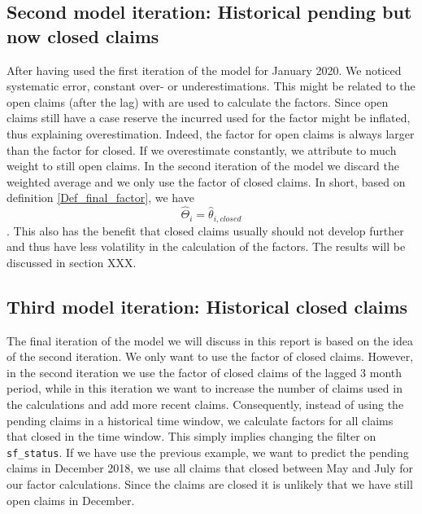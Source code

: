 \subsection{Second model iteration: Historical pending but now closed claims}
After having used the first iteration of the model for January 2020. We noticed systematic error, constant over- or underestimations. This might be related to the open claims (after the lag) with are used to calculate the factors. Since open claims still have a case reserve the incurred used for the factor might be inflated, thus explaining overestimation. Indeed, the factor for open claims is always larger than the factor for closed. If we overestimate constantly, we attribute to much weight to still open claims. In the second iteration of the model we discard the weighted average and we only use the factor of closed claims. In short, based on definition \ref{Def_final_factor}, we have
$$\hat{\Theta}_i = \hat{\theta}_{i,closed}$$.
This also has the benefit that closed claims usually should not develop further and thus have less volatility in the calculation of the factors. The results will be discussed in section XXX.
\subsection{Third model iteration: Historical closed claims}
The final iteration of the model we will discuss in this report is based on the idea of the second iteration. We only want to use the factor of closed claims. However, in the second iteration we use the factor of closed claims of the lagged 3 month period, while in this iteration we want to increase the number of claims used in the calculations and add more recent claims. Consequently, instead of using the pending claims in a historical time window, we calculate factors for all claims that closed in the time window. This simply implies changing the filter on \texttt{sf\_status}. If we have use the previous example, we want to predict the pending claims in December 2018, we use all claims that closed between May and July for our factor calculations. Since the claims are closed it is unlikely that we have still open claims in December.
